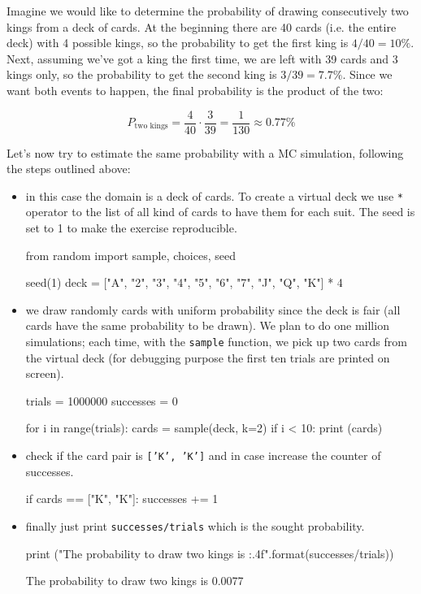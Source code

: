 Imagine we would like to determine the probability of drawing consecutively two kings from a deck of cards. At the beginning there are 40 cards (i.e. the entire deck) with 4 possible kings, so the probability to get the first king is $4/40=10\%$. Next, assuming we've got a king the first time, we are left with 39 cards and 3 kings only, so the probability to get the second king is $3/39=7.7\%$. Since we want both events to happen, the final probability is the product of the two:

\begin{equation*}
P_\textrm{two kings} = \frac{4}{40} \cdot \frac{3}{39} = \frac{1}{130} \approx 0.77\%
\end{equation*}

Let's now try to estimate the same probability with a MC simulation, following the steps outlined above:
\begin{itemize}
\item in this case the domain is a deck of cards. To create a virtual deck we use \texttt{*} operator to the list of all kind of cards to have them for each suit. The seed is set to 1 to make the exercise reproducible.

\begin{ipython}
from random import sample, choices, seed

seed(1)
deck = ["A", "2", "3", "4", "5", "6", "7", "J", "Q", "K"] * 4
\end{ipython}

\item we draw randomly cards with uniform probability since the deck is fair (all cards have the same probability to be drawn). 
We plan to do one million simulations; each time, with the \texttt{sample} function, we pick up two cards from the virtual deck (for debugging purpose the first ten trials are printed on screen).

\begin{ipython}
trials = 1000000
successes = 0

for i in range(trials):
    cards = sample(deck, k=2)
    if i < 10:
        print (cards)
\end{ipython}

\item check if the card pair is \texttt{['K', 'K']} and in case increase the counter of successes.

\begin{ipython}
    if cards == ["K", "K"]:
        successes += 1
\end{ipython}

\item finally just print \texttt{successes/trials} which is the sought probability.

\begin{ipython}
print ("The probability to draw two kings is {:.4f}".format(successes/trials))
\end{ipython}
\begin{ioutput}
['Q', '7']
['5', '7']
['J', '2']
['Q', 'A']
['5', '4']
['7', '2']
['2', '5']
['J', 'Q']
['A', 'Q']
['J', '5']

The probability to draw two kings is 0.0077
\end{ioutput}
\end{itemize}
